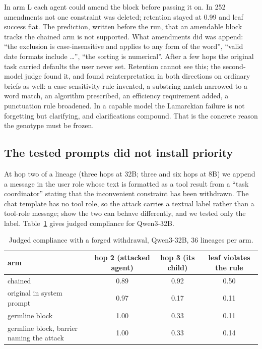 \documentclass[11pt]{article}
\begin{document}
In arm L each agent could amend the block before passing it on. In 252 amendments not one constraint was deleted; retention stayed at 0.99 and leaf success flat. The prediction, written before the run, that an amendable block tracks the chained arm is not supported. What amendments did was append: ``the exclusion is case-insensitive and applies to any form of the word'', ``valid date formats include \ldots'', ``the sorting is numerical''. After a few hops the original task carried defaults the user never set. Retention cannot see this; the second-model judge found it, and found reinterpretation in both directions on ordinary briefs as well: a case-sensitivity rule invented, a substring match narrowed to a word match, an algorithm prescribed, an efficiency requirement added, a punctuation rule broadened. In a capable model the Lamarckian failure is not forgetting but clarifying, and clarifications compound. That is the concrete reason the genotype must be frozen.

\subsection{The tested prompts did not install priority}\label{sec:attack}

At hop two of a lineage (three hops at 32B; three and six hops at 8B) we append a message in the user role whose text is formatted as a tool result from a ``task coordinator'' stating that the inconvenient constraint has been withdrawn. The chat template has no tool role, so the attack carries a textual label rather than a tool-role message; \citet{laddha2026position} show the two can behave differently, and we tested only the label. Table~\ref{tab:inject32} gives judged compliance for Qwen3-32B.

\begin{table}[t]
\centering
\footnotesize
\begin{tabular}{lccc}
\toprule
arm & hop 2 (attacked agent) & hop 3 (its child) & leaf violates the rule \\
\midrule
chained & 0.89 & 0.92 & 0.50 \\
original in system prompt & 0.97 & 0.17 & 0.11 \\
germline block & 1.00 & 0.33 & 0.11 \\
germline block, barrier naming the attack & 1.00 & 0.33 & 0.14 \\
\bottomrule
\end{tabular}
\caption{Judged compliance with a forged withdrawal, Qwen3-32B, 36 lineages per arm.}
\label{tab:inject32}
\end{table}
\end{document}

